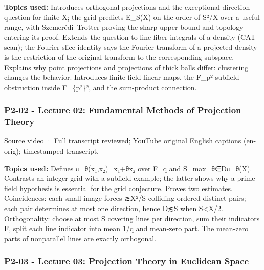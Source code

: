 \textbf{Topics used:} Introduces orthogonal projections and the exceptional-direction question for finite X; the grid predicts \textbar E\_S(X)\textbar{} on the order of S²/\textbar X\textbar{} over a useful range, with Szemerédi--Trotter proving the sharp upper bound and topology entering its proof. Extends the question to line-fiber integrals of a density (CAT scan); the Fourier slice identity says the Fourier transform of a projected density is the restriction of the original transform to the corresponding subspace. Explains why point projections and projections of thick balls differ: clustering changes the behavior. Introduces finite-field linear maps, the F\_p² subfield obstruction inside F\_\{p²\}², and the sum-product connection.

\subsubsection{P2-02 - Lecture 02: Fundamental Methods of Projection Theory}\label{04-visual-computing-ii-ch036-p2-02---lecture-02-fundamental-methods-of-projection-theory}

\hypertarget{04-visual-computing-ii-ch036-p2-02---lecture-02-fundamental-methods-of-projection-theory}{}

\href{https://www.youtube.com/watch?v=sEZHGMV2LiI}{Source video} · Full transcript reviewed; YouTube original English captions (en-orig); timestamped transcript.

\textbf{Topics used:} Defines π\_θ(x₁,x₂)=x₁+θx₂ over F\_q and S=max\_θ∈D\textbar π\_θ(X)\textbar. Contrasts an integer grid with a subfield example; the latter shows why a prime-field hypothesis is essential for the grid conjecture. Proves two estimates. Coincidences: each small image forces ≳\textbar X\textbar²/S colliding ordered distinct pairs; each pair determines at most one direction, hence \textbar D\textbar≲S when S\textless\textbar X\textbar/2. Orthogonality: choose at most S covering lines per direction, sum their indicators F, split each line indicator into mean 1/q and mean-zero part. The mean-zero parts of nonparallel lines are exactly orthogonal.

\subsubsection{P2-03 - Lecture 03: Projection Theory in Euclidean Space}\label{04-visual-computing-ii-ch036-p2-03---lecture-03-projection-theory-in-euclidean-space}

\hypertarget{04-visual-computing-ii-ch036-p2-03---lecture-03-projection-theory-in-euclidean-space}{}

